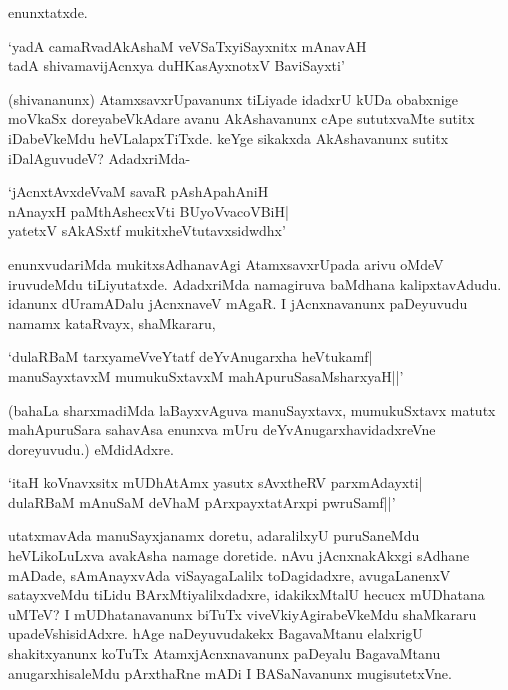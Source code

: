 enunxtatxde.

\begin{shloka}
`yadA camaRvadAkAshaM veVSaTxyiSayxnitx mAnavAH\\
tadA shivamavijAcnxya duHKasAyxnotxV BaviSayxti'
\end{shloka}

(shivananunx) AtamxsavxrUpavanunx tiLiyade idadxrU kUDa obabxnige moVkaSx doreyabeVkAdare avanu AkAshavanunx cApe sututxvaMte sutitx iDabeVkeMdu heVLalapxTiTxde. keYge sikakxda AkAshavanunx sutitx iDalAguvudeV? AdadxriMda-

\begin{shloka}
`jAcnxtAvxdeVvaM savaR pAshApahAniH\\
nAnayxH paMthAshecxVti BUyoVvacoVBiH|\\
yatetxV sAkASxtf mukitxheVtutavxsidwdhx'
\end{shloka}

enunxvudariMda mukitxsAdhanavAgi AtamxsavxrUpada arivu oMdeV iruvudeMdu tiLiyutatxde. AdadxriMda namagiruva baMdhana kalipxtavAdudu. idanunx dUramADalu jAcnxnaveV mAgaR. I jAcnxnavanunx paDeyuvudu namamx kataRvayx, shaMkararu,

\begin{shloka}
`dulaRBaM tarxyameVveYtatf deYvAnugarxha heVtukamf|\\
manuSayxtavxM mumukuSxtavxM mahApuruSasaMsharxyaH||'
\end{shloka}

(bahaLa sharxmadiMda laBayxvAguva manuSayxtavx, mumukuSxtavx matutx mahApuruSara sahavAsa enunxva mUru deYvAnugarxhavidadxreVne doreyuvudu.) eMdidAdxre.

\begin{shloka}
`itaH koVnavxsitx mUDhAtAmx yasutx sAvxtheRV parxmAdayxti|\\
dulaRBaM mAnuSaM deVhaM pArxpayxtatArxpi pwruSamf||'
\end{shloka}

utatxmavAda manuSayxjanamx doretu, adaralilxyU puruSaneMdu heVLikoLuLxva avakAsha namage doretide. nAvu jAcnxnakAkxgi sAdhane mADade, sAmAnayxvAda viSayagaLalilx toDagidadxre, avugaLanenxV satayxveMdu tiLidu BArxMtiyalilxdadxre, idakikxMtalU hecucx mUDhatana uMTeV? I mUDhatanavanunx biTuTx viveVkiyAgirabeVkeMdu shaMkararu upadeVshisidAdxre. hAge naDeyuvudakekx BagavaMtanu elalxrigU shakitxyanunx koTuTx AtamxjAcnxnavanunx paDeyalu BagavaMtanu anugarxhisaleMdu pArxthaRne mADi I BASaNavanunx mugisutetxVne.


\endchapter
